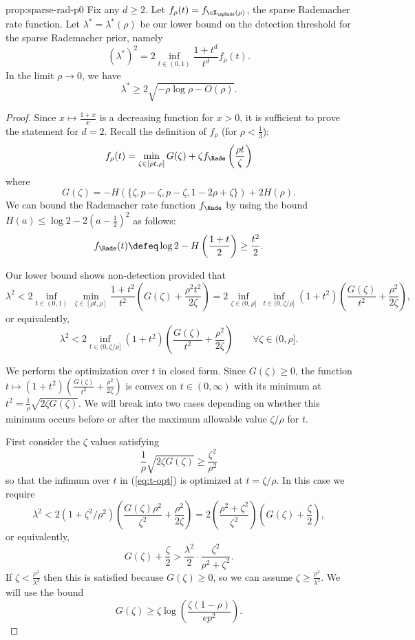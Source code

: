 \documentclass{article}
\begin{document}
\begin{repproposition}{prop:sparse-rad-p0}
Fix any $d \ge 2$. Let $f_\rho(t) = f_{\cX_\spRade (\rho)}$, the sparse Rademacher rate function. Let $\lambda^* = \lambda^*(\rho)$ be our lower bound on the detection threshold for the sparse Rademacher prior, namely
$$(\lambda^*)^2 = 2 \inf_{t \in (0,1)} \frac{1+t^d}{t^d} f_\rho(t).$$
In the limit $\rho \to 0$, we have
$$\lambda^* \ge 2\sqrt{-\rho \log \rho - O(\rho)}.$$
\end{repproposition}

\begin{proof}
Since $x \mapsto \frac{1+x}{x}$ is a decreasing function for $x > 0$, it is sufficient to prove the statement for $d = 2$. Recall the definition of $f_\rho$ (for $\rho < \frac{1}{3}$):
$$f_\rho(t) = \min_{\zeta \in [\rho t,\rho]} G(\zeta) + \zeta f_\Rade\left(\frac{\rho t}{\zeta}\right)$$
where
$$G(\zeta) = -H(\{\zeta,p-\zeta,p-\zeta,1-2\rho+\zeta\}) + 2H(\rho).$$
We can bound the Rademacher rate function $f_\Rade$ by using the bound $H(a) \le \log 2 - 2(a-\frac{1}{2})^2$ as follows:
$$f_\Rade(t) \defeq \log 2 - H\left(\frac{1+t}{2}\right) \ge \frac{t^2}{2}.$$

\noindent Our lower bound shows non-detection provided that
$$\lambda^2 < 2 \inf_{t \in (0,1)}\, \min_{\zeta \in [\rho t,\rho]} \frac{1+t^2}{t^2}\left(G(\zeta) + \frac{\rho^2 t^2}{2 \zeta}\right) = 2 \inf_{\zeta \in (0,\rho]} \, \inf_{t \in (0,\zeta/\rho]} (1+t^2)\left(\frac{G(\zeta)}{t^2} + \frac{\rho^2}{2\zeta}\right),$$
or equivalently,
\begin{equation}
\label{eq:t-opt}
\lambda^2 < 2 \inf_{t \in (0,\zeta/\rho]} (1+t^2)\left(\frac{G(\zeta)}{t^2} + \frac{\rho^2}{2\zeta}\right) \qquad \forall \zeta \in (0,\rho].
\end{equation}

\noindent We perform the optimization over $t$ in closed form. Since $G(\zeta) \ge 0$, the function $t \mapsto (1+t^2)\left(\frac{G(\zeta)}{t^2} + \frac{\rho^2}{2\zeta}\right)$ is convex on $t \in (0,\infty)$ with its minimum at $t^2 = \frac{1}{\rho}\sqrt{2\zeta G(\zeta)}$. We will break into two cases depending on whether this minimum occurs before or after the maximum allowable value $\zeta/\rho$ for $t$.

First consider the $\zeta$ values satisfying
\begin{equation}
\label{eq:zeta-cond}
\frac{1}{\rho}\sqrt{2\zeta G(\zeta)} \ge \frac{\zeta^2}{\rho^2}
\end{equation}
so that the infimum over $t$ in (\ref{eq:t-opt}) is optimized at $t = \zeta/\rho$. In this case we require
$$\lambda^2 < 2 (1 + \zeta^2/\rho^2)\left(\frac{G(\zeta) \rho^2}{\zeta^2}+\frac{\rho^2}{2\zeta}\right) = 2 \left(\frac{\rho^2 + \zeta^2}{\zeta^2}\right)\left(G(\zeta) + \frac{\zeta}{2}\right),$$
or equivalently,
$$G(\zeta) + \frac{\zeta}{2} > \frac{\lambda^2}{2} \cdot\frac{\zeta^2}{\rho^2+\zeta^2}.$$
If $\zeta < \frac{\rho^2}{\lambda^2}$ then this is satisfied because $G(\zeta) \ge 0$, so we can assume $\zeta \ge \frac{\rho^2}{\lambda^2}$. We will use the bound
\begin{equation}
\label{eq:G-bound}
G(\zeta) \ge \zeta \log\left(\frac{\zeta(1-\rho)}{ep^2}\right).
\end{equation}


\end{proof}
\end{document}
